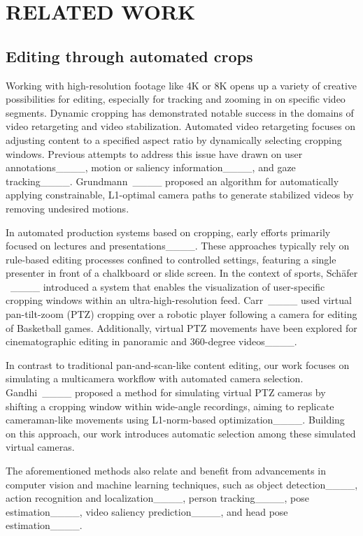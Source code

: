 \section{RELATED WORK}
\subsection{Editing through automated crops}

Working with high-resolution footage like 4K or 8K opens up a variety of creative possibilities for editing, especially for tracking and zooming in on specific video segments. Dynamic cropping has demonstrated notable success in the domains of video retargeting and video stabilization. Automated video retargeting focuses on adjusting content to a specified aspect ratio by dynamically selecting cropping windows. Previous attempts to address this issue have drawn on user annotations____, motion or saliency information____, and gaze tracking____. Grundmann~\etal____ proposed an algorithm for automatically applying constrainable, L1-optimal camera paths to generate stabilized videos by removing undesired motions. 

In automated production systems based on cropping, early efforts primarily focused on lectures and presentations____. These approaches typically rely on rule-based editing processes confined to controlled settings, featuring a single presenter in front of a chalkboard or slide screen. In the context of sports, Schäfer ~\etal____ introduced a system that enables the visualization of user-specific cropping windows within an ultra-high-resolution feed. Carr~\etal____ used virtual pan-tilt-zoom (PTZ) cropping over a robotic player following a camera for editing of Basketball games. Additionally, virtual PTZ movements have been explored for cinematographic editing in panoramic and 360-degree videos____.

In contrast to traditional pan-and-scan-like content editing, our work focuses on simulating a multicamera workflow with automated camera selection. Gandhi~\etal____ proposed a method for simulating virtual PTZ cameras by shifting a cropping window within wide-angle recordings, aiming to replicate cameraman-like movements using L1-norm-based optimization____. Building on this approach, our work introduces automatic selection among these simulated virtual cameras. 

The aforementioned methods also relate and benefit from advancements in computer vision and machine learning techniques, such as object detection____, action recognition and localization____, person tracking____, pose estimation____, video saliency prediction____, and head pose estimation____. 

